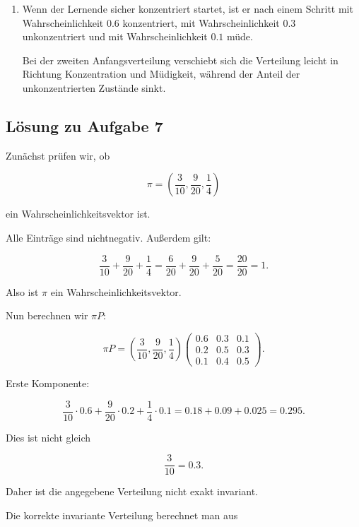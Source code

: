\documentclass[11pt,a4paper]{article}
\begin{document}
\begin{enumerate}
    \[
    \mu_1 =
    (
    0.2\cdot 0.6 + 0.5\cdot 0.2 + 0.3\cdot 0.1,\;
    0.2\cdot 0.3 + 0.5\cdot 0.5 + 0.3\cdot 0.4,\;
    0.2\cdot 0.1 + 0.5\cdot 0.3 + 0.3\cdot 0.5
    ).
    \]

    Damit:

    \[
    \mu_1=(0.25,0.43,0.32).
    \]

    \item Wenn der Lernende sicher konzentriert startet, ist er nach einem Schritt mit Wahrscheinlichkeit $0.6$ konzentriert, mit Wahrscheinlichkeit $0.3$ unkonzentriert und mit Wahrscheinlichkeit $0.1$ müde.

    Bei der zweiten Anfangsverteilung verschiebt sich die Verteilung leicht in Richtung Konzentration und Müdigkeit, während der Anteil der unkonzentrierten Zustände sinkt.
\end{enumerate}

\subsection*{Lösung zu Aufgabe 7}

Zunächst prüfen wir, ob

\[
\pi=
\left(
\frac{3}{10},
\frac{9}{20},
\frac{1}{4}
\right)
\]

ein Wahrscheinlichkeitsvektor ist.

Alle Einträge sind nichtnegativ. Außerdem gilt:

\[
\frac{3}{10}+\frac{9}{20}+\frac14
=
\frac{6}{20}+\frac{9}{20}+\frac{5}{20}
=
\frac{20}{20}
=
1.
\]

Also ist $\pi$ ein Wahrscheinlichkeitsvektor.

Nun berechnen wir $\pi P$:

\[
\pi P
=
\left(
\frac{3}{10},
\frac{9}{20},
\frac14
\right)
\begin{pmatrix}
0.6 & 0.3 & 0.1 \\
0.2 & 0.5 & 0.3 \\
0.1 & 0.4 & 0.5
\end{pmatrix}.
\]

Erste Komponente:

\[
\frac{3}{10}\cdot 0.6
+
\frac{9}{20}\cdot 0.2
+
\frac14\cdot 0.1
=
0.18+0.09+0.025
=
0.295.
\]

Dies ist nicht gleich

\[
\frac{3}{10}=0.3.
\]

Daher ist die angegebene Verteilung nicht exakt invariant.

Die korrekte invariante Verteilung berechnet man aus
\end{document}
